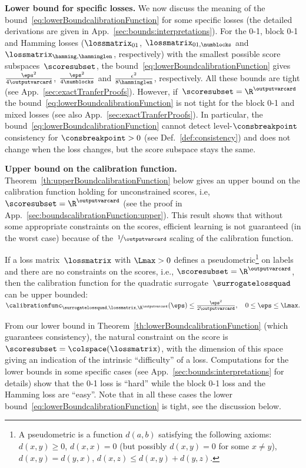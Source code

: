 \documentclass{article}
\begin{document}
\textbf{Lower bound for specific losses.} We now discuss the meaning of the bound~\eqref{eq:lowerBoundcalibrationFunction} for some specific losses (the detailed derivations are given in App.~\ref{sec:bounds:interpretations}).
For the 0-1, block 0-1 and Hamming losses ($\lossmatrix_{01}$, $\lossmatrix_{01,\numblocks}$ and $\lossmatrix_{\hamming,\hamminglen}$, respectively) with the smallest possible score subspaces~$\scoresubset$, the bound~\eqref{eq:lowerBoundcalibrationFunction} gives ~$\frac{\eps^2}{4\outputvarcard}$, $\frac{\eps^2}{4\numblocks}$ and $\frac{\epsilon^2}{8\hamminglen}$, respectively.
All these bounds are tight (see App.~\ref{sec:exactTranferProofs}).
However, if~$\scoresubset = \R^\outputvarcard$ the bound~\eqref{eq:lowerBoundcalibrationFunction} is not tight for the block 0-1 and mixed losses (see also App.~\ref{sec:exactTranferProofs}).
In particular, the bound~\eqref{eq:lowerBoundcalibrationFunction} cannot detect level-$\consbreakpoint$ consistency for $\consbreakpoint > 0$ (see Def.~\ref{def:consistency}) and does not change when the loss changes, but the score subspace stays the same.


\textbf{Upper bound on the calibration function.}
Theorem~\ref{th:upperBoundcalibrationFunction} below gives an upper bound on the calibration function holding for unconstrained scores, i.e, $\scoresubset = \R^{\outputvarcard}$ (see the proof in App.~\ref{sec:boundscalibrationFunction:upper}).
This result shows that without some appropriate constraints on the scores, efficient learning is not guaranteed (in the worst case) because of the~$\nicefrac{1}{\outputvarcard}$ scaling of the calibration function.
\begin{theorem}
    \label{th:upperBoundcalibrationFunction}
    If a loss matrix~$\lossmatrix$ with $\Lmax > 0$ defines a pseudometric\footnote{\label{footnote:pseudometric}A pseudometric is a function $d(a,b)$ satisfying the following axioms: $d(x, y) \geq 0$, $d(x, x) = 0$ (but possibly $d(x,y)=0$ for some $x\neq y$), $d(x, y) = d(y, x)$, $d(x, z) \leq d(x, y) + d(y, z)$.} on labels and there are no constraints on the scores, i.e., $\scoresubset = \R^{\outputvarcard}$, then the calibration function for the quadratic surrogate~$\surrogatelossquad$ can be upper bounded:
%
    $
    \calibrationfunc_{\surrogatelossquad,\lossmatrix,\R^{\outputvarcard}}(\eps)
    \leq  \frac{\eps^2}{2\outputvarcard}, \quad 0 \leq \eps \leq \Lmax.
    $
%
\end{theorem}
%
From our lower bound in Theorem~\ref{th:lowerBoundcalibrationFunction} (which guarantees consistency), the natural constraint on the score is $\scoresubset = \colspace(\lossmatrix)$, with the dimension of this space giving an indication of the intrinsic ``difficulty'' of a loss.
Computations for the lower bounds in some specific cases (see App.~\ref{sec:bounds:interpretations} for details) show that the 0-1 loss is ``hard'' while the block 0-1 loss and the Hamming loss are ``easy''.
Note that in all these cases the lower bound~\eqref{eq:lowerBoundcalibrationFunction} is tight, see the discussion below.
\end{document}
